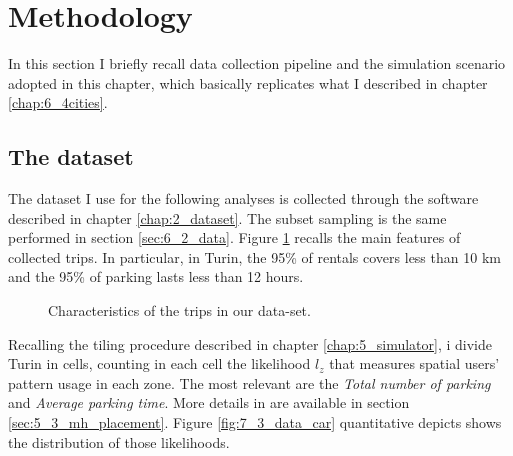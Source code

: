 \section{Methodology}
\label{sec:7_3_data}
In this section I briefly recall data collection pipeline and the simulation scenario adopted in this chapter, which basically replicates what I described in chapter \ref{chap:6_4cities}.

\subsection{The dataset}
The dataset I use for the following analyses is collected through the software described in chapter \ref{chap:2_dataset}. The subset sampling is the same performed in section \ref{sec:6_2_data}. Figure \ref{fig:7_3_ECDFs} recalls the main features of collected trips. In particular, in Turin, the 95\% of rentals covers less than 10 km and the 95\% of parking lasts less than 12 hours. 

\begin{figure}[th]
	\centering
	\caption{Characteristics of the trips in our data-set.}
	\label{fig:7_3_ECDFs}
\end{figure}

Recalling the tiling procedure described in chapter \ref{chap:5_simulator}, i divide Turin in cells, counting in each cell the likelihood $l_z$ that measures spatial users' pattern usage in each zone. The most relevant are the \textit{Total number of parking} and \textit{Average parking time}. More details in are available in section \ref{sec:5_3_mh_placement}. Figure \ref{fig:7_3_data_car} quantitative depicts  shows the distribution of those likelihoods. 

